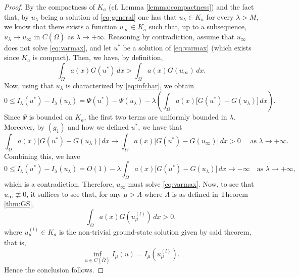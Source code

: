 \documentclass[11pt,reqno]{amsart}
\theoremstyle{plain}
\theoremstyle{definition}
\numberwithin{equation}{section}
\begin{document}
\begin{proof}
    By the compactness of $K_a$ (cf. Lemma \ref{lemma:compactness}) and the fact that, by $u_\lambda$ being a solution of \eqref{eq-general} one has that $u_\lambda \in K_a$ for every $\lambda > M$, we know that there exists a function $u_\infty \in K_a$ such that, up to a subsequence, $u_\lambda \to u_\infty$ in $C(\overline{\Omega})$ as $\lambda \to +\infty$. Reasoning by contradiction, assume that $u_\infty$ does not solve \eqref{eq:varmax}, and let $u^*$ be a solution of \eqref{eq:varmax} (which exists since $K_a$ is compact). Then, we have, by definition,
    $$\int_\Omega a(x) G(u^*) \, dx > \int_\Omega a(x) G(u_\infty) \, dx.$$
    Now, using that $u_\lambda$ is characterized by \eqref{eq:infchar}, we obtain
    $$0 \leq I_\lambda(u^*) - I_\lambda(u_\lambda)  = \Psi (u^*) - \Psi (u_\lambda) - \lambda \left( \int_\Omega a(x) \big[ G(u^*) - G(u_\lambda) \big ] \, dx \right).$$
    Since $\Psi$ is bounded on $K_a $, the first two terms are uniformly bounded in $\lambda$. Moreover, by $(g_1)$ and how we defined $u^*$, we have that
    $$\int_\Omega a(x) \big [ G(u^*) - G(u_\lambda) \big ] \, dx \to \int_\Omega a(x) \big [ G(u^*) - G(u_\infty) \big ] \, dx > 0 \quad \text{ as } \lambda \to +\infty.$$
    Combining this, we have
    $$0 \leq I_\lambda (u^*) - I_\lambda(u_\lambda) = O(1) -  \lambda \int_\Omega a(x) \big [ G(u^*) - G(u_\lambda) \big ] \, dx \to -\infty  \quad \text{as } \lambda \to +\infty,$$
    which is a contradiction. Therefore, $u_\infty$ must solve \eqref{eq:varmax}. Now, to see that $u_\infty \not \equiv 0$, it suffices to see that, for any $\mu > \Lambda$ where $\Lambda$ is as defined in Theorem \ref{thm:GS}, $$\int_\Omega a(x)G(u_\mu^{(l)}) \, dx >0,$$ 
    where $u_\mu^{(l)} \in K_a$ is the non-trivial ground-state solution given by said theorem, that is,
    $$\inf_{u \in C(\overline \Omega)}I_\mu(u) = I_\mu(u_\mu^{(l)} ).$$ Hence the conclusion follows.
\end{proof}
\end{document}
